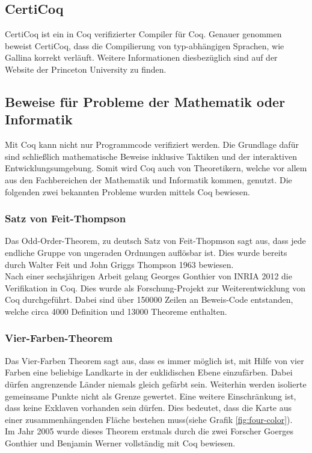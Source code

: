 \subsection{CertiCoq}
CertiCoq ist ein in Coq verifizierter Compiler für Coq. Genauer genommen beweist CertiCoq, dass die Compilierung von typ-abhängigen Sprachen, wie Gallina korrekt verläuft.\cite{CERTICOQ01:FV}\cite{CERTICOQ02:FV} Weitere Informationen diesbezüglich sind auf der Website der Princeton University zu finden.

\subsection{Beweise für Probleme der Mathematik oder Informatik}
Mit Coq kann nicht nur Programmcode verifiziert werden. Die Grundlage dafür sind schließlich mathematische Beweise inklusive Taktiken und der interaktiven Entwicklungsumgebung. Somit wird Coq auch von Theoretikern, welche vor allem aus den Fachbereichen der Mathematik und Informatik kommen, genutzt. Die folgenden zwei bekannten Probleme wurden mittels Coq bewiesen. 

\subsubsection{Satz von Feit-Thompson}
Das Odd-Order-Theorem, zu deutsch Satz von Feit-Thopmson sagt aus, dass jede endliche Gruppe von ungeraden Ordnungen auflösbar ist. Dies wurde bereits durch Walter Feit und John Griggs Thompson 1963 bewiesen.\\
Nach einer sechsjährigen Arbeit gelang Georges Gonthier von INRIA 2012 die Verifikation in Coq. Dies wurde als Forschung-Projekt zur Weiterentwicklung von Coq durchgeführt. Dabei sind über 150000 Zeilen an Beweis-Code entstanden, welche circa 4000 Definition und 13000 Theoreme enthalten.\cite{ODD01:FV}

\subsubsection{Vier-Farben-Theorem}
Das Vier-Farben Theorem sagt aus, dass es immer möglich ist, mit Hilfe von vier Farben eine beliebige Landkarte in der euklidischen Ebene einzufärben. Dabei dürfen angrenzende Länder niemals gleich gefärbt sein. Weiterhin werden isolierte gemeinsame Punkte nicht als Grenze gewertet. Eine weitere Einschränkung ist, dass keine Exklaven vorhanden sein dürfen. Dies bedeutet, dass die Karte aus einer zusammenhängenden Fläche bestehen muss(siehe Grafik \ref{fig:four-color}).\cite{FOURCOLORS01:FV}\\
Im Jahr 2005 wurde dieses Theorem erstmals durch die zwei Forscher Goerges Gonthier und Benjamin Werner vollständig mit Coq bewiesen.
\cite{FOURCOLORS02:FV}\\

